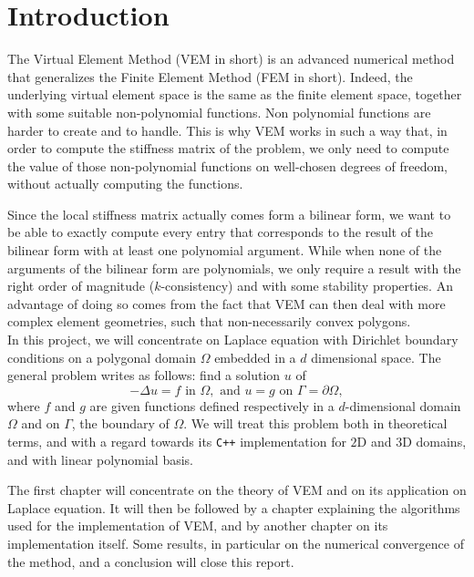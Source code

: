 \newpage
\section*{Introduction} 

The Virtual Element Method (VEM in short) is an advanced numerical method that generalizes the Finite Element Method (FEM in short). Indeed, the underlying virtual element space is the same as the finite element space, together with some suitable non-polynomial functions. Non polynomial functions are harder to create and to handle. This is why VEM works in such a way that, in order to compute the stiffness matrix of the problem, we only need to compute the value of those non-polynomial functions on well-chosen degrees of freedom, without actually computing the functions. 

Since the local stiffness matrix actually comes form a bilinear form, we want to be able to exactly compute every entry that corresponds to the result of the bilinear form with at least one polynomial argument. While when none of the arguments of the bilinear form are polynomials, we only require a result with the right order of magnitude ($k$-consistency) and with some stability properties. An advantage of doing so comes from the fact that VEM can then deal with more complex element geometries, such that non-necessarily convex polygons.\\

In this project, we will concentrate on Laplace equation with Dirichlet boundary conditions on a polygonal domain $\Omega$ embedded in a $d$ dimensional space. The general problem writes as follows: find a solution $u$ of
$$ -\Delta u = f \text{ in } \Omega, \text{ and } u = g \text{ on } \Gamma = \partial \Omega, $$
where $f$ and $g$ are given functions defined respectively in a $d$-dimensional domain $\Omega$ and on $\Gamma$, the boundary of $\Omega$.
We will treat this problem both in theoretical terms, and with a regard towards its \verb!C++! implementation for $2$D and $3$D domains, and with linear polynomial basis. \newline

The first chapter will concentrate on the theory of VEM and on its application on Laplace equation. It will then be followed by a chapter explaining the algorithms used for the implementation of VEM, and by another chapter on its implementation itself. Some results, in particular on the numerical convergence of the method, and a conclusion will close this report. 


